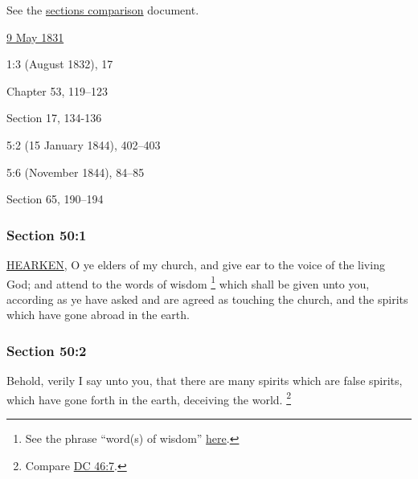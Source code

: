 		See the \href{https://drive.google.com/file/d/1goAvNz8jS4R8slYfMG_db55Ty2z_vmgK/view?usp=sharing}{sections comparison} document.
	
		\begin{compactdesc}
			\item[JSP] \hyperref[EMS-1831-JS-9-MAY-1831]{9 May 1831}
			\item[EMS] 1:3 (August 1832), 17
			\item[BC] Chapter 53, 119--123
			\item[DC 1835] Section 17, 134-136
			\item[TS] 5:2 (15 January 1844), 402--403
			\item[MS] 5:6 (November 1844), 84--85
			\item[DC 1844] Section 65, 190--194
		\end{compactdesc}

	\subsubsection{Section 50:1} %
		\label{DC50-1}

		\hyperref[HEARKEN]{HEARKEN}, O ye elders of my church, and give ear to the voice of the living God; and attend to the words of wisdom%
			\footnote{%
				See the phrase ``word(s) of wisdom'' \hyperref[WISDOM-PHRASES]{here}.
				}
		which shall be given unto you, according as ye have asked and are agreed as touching the church, and the spirits which have gone abroad in the earth.


	\subsubsection{Section 50:2} %
		\label{DC50-2}

		Behold, verily I say unto you, that there are many spirits which are false spirits, which have gone forth in the earth, deceiving the world.%
			\footnote{%
				Compare \hyperref[DC46-7]{DC 46:7}.
				}

